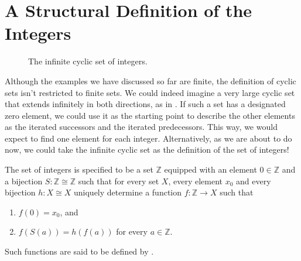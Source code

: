 \section{A Structural Definition of the Integers}

\begin{figure}[t]
  \centering
  \caption[The infinite cyclic set of integers]{The infinite cyclic set of integers.}
  \label{figure:integers}
\end{figure}

Although the examples we have discussed so far are finite, the definition of cyclic sets isn't restricted to finite sets. We could indeed imagine a very large cyclic set that extends infinitely in both directions, as in . If such a set has a designated zero element, we could use it as the starting point to describe the other elements as the iterated successors and the iterated predecessors. This way, we would expect to find one element for each integer. Alternatively, as we are about to do now, we could take the infinite cyclic set as the definition of the set of integers!

\begin{definition}\label{definition:integers}
  The set of integers is specified to be a set $\mathbb{Z}$ equipped with an element $0\in \mathbb{Z}$ and a bijection $S:\mathbb{Z}\cong\mathbb{Z}$ such that for every set $X$, every element $x_0$ and every bijection $h:X\cong X$ uniquely determine a function $f:\mathbb{Z}\to X$ such that
  \begin{enumerate}
  \item $f(0)=x_0$, and
  \item $f(S(a))=h(f(a))$ for every $a\in\mathbb{Z}$.
  \end{enumerate}
  Such functions are said to be defined by .
\end{definition}

